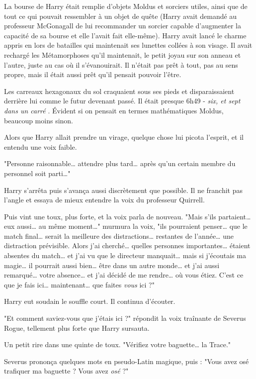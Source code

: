 La bourse de Harry était remplie d'objets Moldus et sorciers utiles, ainsi que de tout ce qui pouvait ressembler à un objet de quête (Harry avait demandé au professeur McGonagall de lui recommander un sorcier capable d'augmenter la capacité de sa bourse et elle l'avait fait elle-même). Harry avait lancé le charme appris en lors de batailles qui maintenait ses lunettes collées à son visage. Il avait rechargé les Métamorphoses qu'il maintenait, le petit joyau sur son anneau et l'autre, juste au cas où il s'évanouirait. Il n'était pas prêt à tout, pas au sens propre, mais il était aussi prêt qu'il pensait pouvoir l'être.

Les carreaux hexagonaux du sol craquaient sous ses pieds et disparaissaient derrière lui comme le futur devenant passé. Il était presque 6h49 - \emph{six, et sept dans un carré} . Évident si on pensait en termes mathématiques Moldus, beaucoup moins sinon.

Alors que Harry allait prendre un virage, quelque chose lui picota l'esprit, et il entendu une voix faible.

"Personne raisonnable… attendre plus tard… après qu'un certain membre du personnel soit parti…"

Harry s'arrêta puis s'avança aussi discrètement que possible. Il ne franchit pas l'angle et essaya de mieux entendre la voix du professeur Quirrell.

Puis vint une toux, plus forte, et la voix parla de nouveau. "Mais s'ils partaient… eux aussi… au même moment…" murmura la voix, "ils pourraient penser… que le match final… serait la meilleure des distractions… restantes de l'année… une distraction prévisible. Alors j'ai cherché… quelles personnes importantes… étaient absentes du match… et j'ai vu que le directeur manquait… mais si j'écoutais ma magie… il pourrait aussi bien… être dans un autre monde… et j'ai aussi remarqué… votre absence… et j'ai décidé de me rendre… où vous étiez. C'est ce que je fais ici… maintenant… que faites \emph{vous}  ici ?"

Harry eut soudain le souffle court. Il continua d'écouter.

"Et comment saviez-vous que j'étais ici ?" répondit la voix traînante de Severus Rogue, tellement plus forte que Harry sursauta.

Un petit rire dans une quinte de toux. "Vérifiez votre baguette… la Trace."

Severus prononça quelques mots en pseudo-Latin magique, puis : "Vous avez osé trafiquer ma baguette ? Vous avez \emph{osé}  ?"


